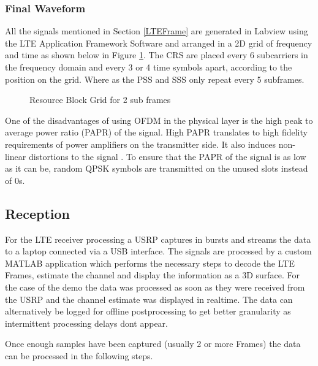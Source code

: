 
\subsubsection{Final Waveform}
All the signals mentioned in Section \ref{LTEFrame} are generated in Labview using the LTE Application Framework Software and arranged in a 2D grid of frequency and time as shown below in Figure \ref{fig:RBSignals}. The CRS are placed every 6 subcarriers in the frequency domain and every 3 or 4 time symbols apart, according to the position on the grid. Where as the PSS and SSS only repeat every 5 subframes.

\begin{figure}[H]
    \begin{center}
        \caption{Resource Block Grid for 2 sub frames}
        \label{fig:RBSignals}
    \end{center}
\end{figure}

One of the disadvantages of using OFDM in the physical layer is the high peak to average power ratio (PAPR) of the signal. High PAPR translates to high fidelity requirements of power amplifiers on the transmitter side. It also induces non-linear distortions to the signal \cite{rohling}. To ensure that the PAPR of the signal is as low as it can be, random QPSK symbols are transmitted on the unused slots instead of 0s.

\subsection{Reception}

For the LTE receiver processing a USRP captures in bursts and streams the data to a laptop connected via a USB interface. The signals are processed by a custom MATLAB application which performs the necessary steps to decode the LTE Frames, estimate the channel and display the information as a 3D surface. For the case of the demo the data was processed as soon as they were received from the USRP and the channel estimate was displayed in realtime. The data can alternatively be logged for offline postprocessing to get better granularity as intermittent processing delays dont appear.

Once enough samples have been captured (usually 2 or more Frames) the data can be processed in the following steps.


